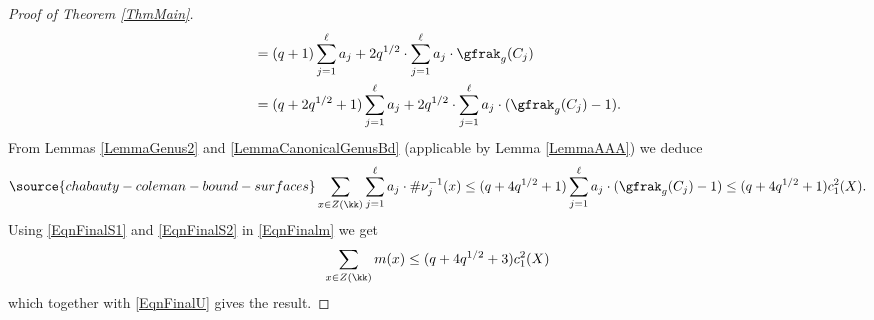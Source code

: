 \begin{proof}[Proof of Theorem \ref{ThmMain}]
$$\begin{aligned}
&= (q+1)\sum_{j=1}^\ell a_j + 2q^{1/2}\cdot \sum_{j=1}^\ell a_j\cdot \gfrak_g(C_j)\\
&= (q+2q^{1/2}+1)\sum_{j=1}^\ell a_j + 2q^{1/2}\cdot \sum_{j=1}^\ell a_j\cdot (\gfrak_g(C_j)-1).
\end{aligned}
$$
From Lemmas \ref{LemmaGenus2} and \ref{LemmaCanonicalGenusBd} (applicable by Lemma \ref{LemmaAAA}) we deduce
\begin{equation}\label{EqnFinalS2}
\source{chabauty-coleman-bound-surfaces}
\sum_{x\in Z(\kk)} \sum_{j=1}^\ell a_j\cdot \#\nu_j^{-1}(x) \le (q+4q^{1/2}+1)\sum_{j=1}^\ell a_j\cdot (\gfrak_g(C_j)-1)\le (q+4q^{1/2}+1)c_1^2(X).
\end{equation}
Using \eqref{EqnFinalS1} and \eqref{EqnFinalS2} in \eqref{EqnFinalm} we get
$$
\sum_{x\in Z(\kk)} m(x)\le (q+4q^{1/2}+3)c_1^2(X)
$$
which together with \eqref{EqnFinalU} gives the result.
\end{proof}


